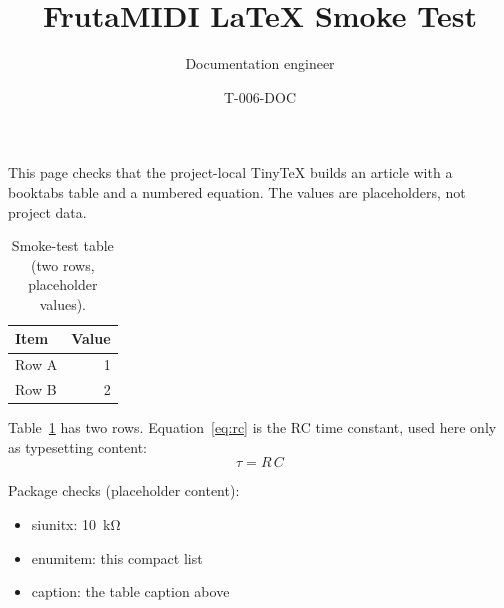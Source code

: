\documentclass[11pt,a4paper]{article}
\title{FrutaMIDI LaTeX Smoke Test}
\author{Documentation engineer}
\date{T-006-DOC}
\begin{document}
\maketitle

This page checks that the project-local TinyTeX builds an article with a
booktabs table and a numbered equation. The values are placeholders, not
project data.

\begin{table}[H]
  \centering
  \caption{Smoke-test table (two rows, placeholder values).}
  \label{tab:smoke}
  \begin{tabular}{lr}
    \toprule
    Item & Value \\
    \midrule
    Row A & 1 \\
    Row B & 2 \\
    \bottomrule
  \end{tabular}
\end{table}

Table~\ref{tab:smoke} has two rows. Equation~\eqref{eq:rc} is the RC time
constant, used here only as typesetting content:
\begin{equation}
  \tau = R\,C
  \label{eq:rc}
\end{equation}

Package checks (placeholder content):
\begin{itemize}[noitemsep]
  \item siunitx: \qty{10}{\kilo\ohm}
  \item enumitem: this compact list
  \item caption: the table caption above
\end{itemize}
\end{document}
